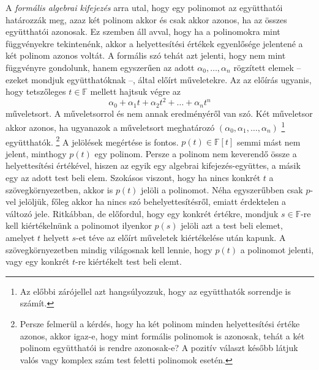\documentclass[9pt,showtrims]{memoir}
\theoremstyle{plain}
\theoremstyle{remark}
\theoremstyle{definition}
\renewcommand{\mathbf}{\mathbb}
\begin{document}
A \emph{formális algebrai kifejezés} arra utal, 
hogy egy polinomot az együtthatói határozzák meg, 
azaz két polinom akkor és csak akkor azonos,
ha az összes együtthatói azonosak.
Ez szemben áll avval, hogy ha a polinomokra mint függvényekre tekintenénk, 
akkor a helyettesítési értékek egyenlősége jelentené a két polinom azonos voltát.
A formális szó tehát azt jelenti, hogy nem mint függvényre gondolunk, 
hanem egyszerűen az adott $\alpha_0,\dots,\alpha_n$ rögzített elemek -- ezeket mondjuk együtthatóknak --,
által előírt műveletekre. 
Az az előírás ugyanis, hogy tetszőleges $t\in\mathbf{F}$ mellett hajtsuk végre az
\[
        \alpha_0+\alpha_1t+\alpha_2t^2+\dots+\alpha_nt^n
\]
műveletsort. 
A műveletsorrol és nem annak eredményéről van szó. 
Két műveletsor akkor azonos, ha ugyanazok a műveletsort meghatározó 
$\left( \alpha_0,\alpha_1,\dots,\alpha_n \right)$%
\footnote{Az előbbi zárójellel azt hangsúlyozzuk, hogy az együtthatók sorrendje is számít.}
együtthatók.%
\footnote{Persze felmerül a kérdés, 
    hogy ha két polinom minden helyettesítési értéke azonos,
    akkor igaz-e, 
    hogy mint formális polinomok is azonosak,
    tehát a két polinom együtthatói is rendre azonosak-e?
    A pozitív választ később látjuk valós vagy komplex szám test feletti polinomok esetén.%
}
A jelölések megértése is fontos.
$p\left( t \right)\in\mathbf{F}\left[ t \right]$ semmi mást nem jelent, 
minthogy $p\left( t \right)$ egy polinom.
Persze a polinom nem keverendő össze a helyettesítési értékével, 
hiszen az egyik egy algebrai kifejezés-együttes, a másik egy az adott test beli elem.
Szokásos viszont, hogy ha nincs konkrét $t$ a szövegkörnyezetben, akkor is $p\left( t \right)$ jelöli a polinomot. 
Néha egyszerűbben csak $p$-vel jelöljük, főleg akkor ha nincs szó behelyettesítésről,
emiatt érdektelen a változó jele.
Ritkábban, de előfordul, hogy egy konkrét értékre, mondjuk $s\in\mathbf{F}$-re kell kiértékelnünk a polinomot ilyenkor $p\left( s \right)$ jelöli azt a test beli elemet,
amelyet $t$ helyett $s$-et téve az előírt műveletek kiértékelése után kapunk.
A szövegkörnyezetben mindig világosnak kell lennie, hogy $p\left( t \right)$ a polinomot jelenti,
vagy egy konkrét $t$-re kiértékelt test beli elemt.
\end{document}
